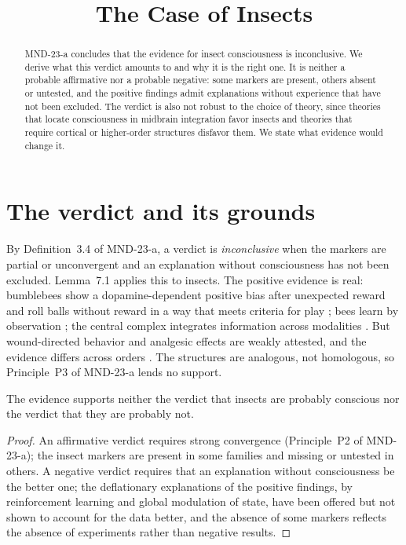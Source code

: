 \documentclass{situationist-preprint}
\title{The Case of Insects}
\begin{document}
\maketitle

\begin{abstract}
MND-23-a concludes that the evidence for insect consciousness is inconclusive. We derive what this verdict amounts to and why it is the right one. It is neither a probable affirmative nor a probable negative: some markers are present, others absent or untested, and the positive findings admit explanations without experience that have not been excluded. The verdict is also not robust to the choice of theory, since theories that locate consciousness in midbrain integration favor insects and theories that require cortical or higher-order structures disfavor them. We state what evidence would change it.
\end{abstract}

\section{The verdict and its grounds}

By Definition~3.4 of MND-23-a, a verdict is \emph{inconclusive} when the markers are partial or unconvergent and an explanation without consciousness has not been excluded. Lemma~7.1 applies this to insects. The positive evidence is real: bumblebees show a dopamine-dependent positive bias after unexpected reward \citep{Solvi2016} and roll balls without reward in a way that meets criteria for play \citep{Dona2022}; bees learn by observation \citep{Chittka2022}; the central complex integrates information across modalities \citep{Barron2016}. But wound-directed behavior and analgesic effects are weakly attested, and the evidence differs across orders \citep{Gibbons2022}. The structures are analogous, not homologous, so Principle~P3 of MND-23-a lends no support.

\begin{proposition}\label{p:neither}
The evidence supports neither the verdict that insects are probably conscious nor the verdict that they are probably not.
\end{proposition}

\begin{proof}
An affirmative verdict requires strong convergence (Principle~P2 of MND-23-a); the insect markers are present in some families and missing or untested in others. A negative verdict requires that an explanation without consciousness be the better one; the deflationary explanations of the positive findings, by reinforcement learning and global modulation of state, have been offered but not shown to account for the data better, and the absence of some markers reflects the absence of experiments rather than negative results.
\end{proof}
\end{document}
